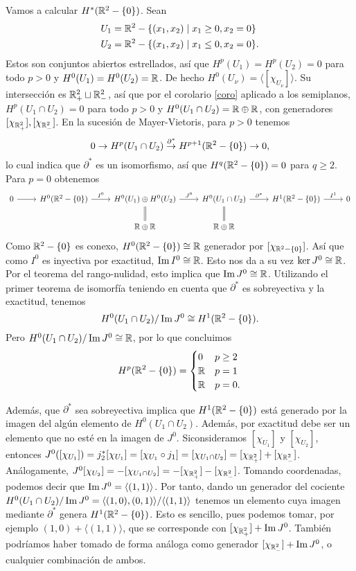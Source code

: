 \documentclass[CV.tex]{subfiles}
\begin{document}
\begin{ej}
Vamos a calcular $H^*(\mathbb{R}^2-\{0\})$. Sean
\begin{align*}
&U_1=\mathbb{R}^2-\{(x_1,x_2)\mid x_1\geq 0, x_2=0\}\\
&U_2=\mathbb{R}^2-\{(x_1,x_2)\mid x_1\leq 0, x_2=0\}.
\end{align*}
Estos son conjuntos abiertos estrellados, así que $H^p(U_1)=H^p(U_2)=0$ para todo $p>0$ y $H^0(U_1)=H^0(U_2)=\mathbb{R}$. De hecho $H^0(U_{\nu})=\langle [\chi_{U_{\nu}}]\rangle$. Su intersección es $\mathbb{R}^2_+\sqcup\mathbb{R}^2_-$, así que por el corolario \ref{coro} aplicado a los semiplanos, $H^p(U_1\cap U_2)=0$ para todo $p>0$ y $H^0(U_1\cap U_2)=\mathbb{R}\oplus\mathbb{R}$, con generadores $[\chi_{\mathbb{R}^2_+}],[\chi_{\mathbb{R}^2_-}]$. En la sucesión de Mayer-Vietoris, para $p>0$ tenemos
\[
0\to H^p(U_1\cap U_2)\overset{\partial^*}{\to} H^{p+1}(\mathbb{R}^2-\{0\})\to 0,
\]
lo cual indica que $\partial^*$ es un isomorfismo, así que $H^{q}(\mathbb{R}^2-\{0\})=0$ para $q\geq 2$. Para $p=0$ obtenemos
\[
\begin{tikzcd}
0\arrow[r] & H^0(\R^2-\{0\})\arrow[r,"I^0"] & H^0(U_1)\oplus H^0(U_2)\arrow[r, "J^0"]\arrow[d,equals] & H^0(U_1\cap U_2)\arrow[r,"\partial^*"]\arrow[d, equals] & H^1(\R^2-\{0\})\arrow[r,"I^1"] & 0\\
 & & \R\oplus\R &\R\oplus\R & & 
\end{tikzcd}
\]
Como $\mathbb{R}^2-\{0\}$ es conexo, $H^0(\mathbb{R}^2-\{0\})\cong\mathbb{R}$ generador por $[\chi_{\mathbb{R}^2-\{0\}}]$. Así que como $I^0$ es inyectiva por exactitud, $\operatorname{Im}{I^0}\cong\mathbb{R}$. Esto nos da a su vez $\ker{J^0}\cong\mathbb{R}$. Por el teorema del rango-nulidad, esto implica que $\operatorname{Im}{J^0}\cong\mathbb{R}$. Utilizando el primer teorema de isomorfía teniendo en cuenta que $\partial^*$ es sobreyectiva y la exactitud, tenemos
\[
H^0(U_1\cap U_2)/\operatorname{Im}{J^0}\cong H^1(\mathbb{R}^2-\{0\}).
\]
Pero $H^0(U_1\cap U_2)/\operatorname{Im}{J^0}\cong\mathbb{R}$, por lo que concluimos
\[
H^p(\mathbb{R}^2-\{0\})=\begin{cases}
0 & p\geq 2\\
\mathbb{R} & p=1\\
\mathbb{R} & p=0.
\end{cases}
\]

Además, que $\partial^*$ sea sobreyectiva implica que $H^1(\mathbb{R}^2-\{0\})$ está generado por la imagen del algún elemento de $H^0(U_1\cap U_2)$. Además, por exactitud debe ser un elemento que no esté en la imagen de $J^0$. Siconsideramos $[\chi_{U_1}]$ y $[\chi_{U_2}]$, entonces $J^0([\chi_{U_1}])=j_2^*[\chi_{U_1}]=[\chi_{U_1}\circ j_1]=[\chi_{U_1\cap U_2}]=[\chi_{\mathbb{R}^2_+}]+[\chi_{\mathbb{R}^2_-}]$. Análogamente, $J^0[\chi_{U_2}]=-[\chi_{U_1\cap U_2}]=-[\chi_{\mathbb{R}^2_+}]-[\chi_{\mathbb{R}^2_-}]$. Tomando coordenadas, podemos decir que $\operatorname{Im}{J^0}=\langle (1,1)\rangle$. Por tanto, dando un generador del cociente $H^0(U_1\cap U_2)/\operatorname{Im}{J^0}=\langle (1,0),(0,1)\rangle/\langle (1,1)\rangle$ tenemos un elemento cuya imagen mediante $\partial^*$ genera $H^1(\mathbb{R}^2-\{0\})$. Esto es sencillo, pues podemos tomar, por ejemplo $(1,0)+\langle (1,1)\rangle$, que se corresponde con $[\chi_{\mathbb{R}^2_+}]+\operatorname{Im}{J^0}$. También podríamos haber tomado de forma análoga como generador $[\chi_{\mathbb{R}^2_-}]+\operatorname{Im}{J^0}$, o cualquier combinación de ambos.
\end{ej}
\end{document}

